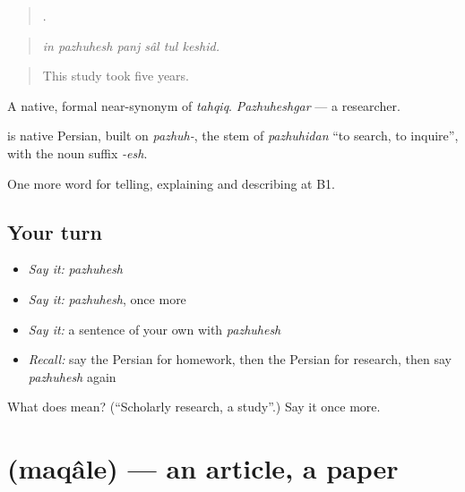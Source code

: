 \begin{quote}
     .
\end{quote}

\begin{quote}
\emph{in pazhuhesh panj sâl tul keshid.}
\end{quote}

\begin{quote}
This study took five years.
\end{quote}

A native, formal near-synonym of \emph{tahqiq}. \emph{Pazhuheshgar} — a researcher.

\begin{cousinweb}
\textbf{} is native Persian, built on \emph{pazhuh-}, the stem of \emph{pazhuhidan} \textquotedblleft{}to search, to inquire\textquotedblright{}, with the noun suffix \emph{-esh}.
\end{cousinweb}

\begin{grammarlens}[title={What you've built}]
One more word for telling, explaining and describing at B1.
\end{grammarlens}

\subsection*{Your turn}
\begin{itemize}
\raggedright
  \item \emph{Say it:} \emph{pazhuhesh}
  \item \emph{Say it:} \emph{pazhuhesh}, once more
  \item \emph{Say it:} a sentence of your own with \emph{pazhuhesh}
  \item \emph{Recall:} say the Persian for homework, then the Persian for research, then say \emph{pazhuhesh} again
\end{itemize}

\begin{tcolorbox}[breakable,colback=teal!4,colframe=teal!35!black,title={Before you move on}]
What does  mean? (\textquotedblleft{}Scholarly research, a study\textquotedblright{}.) Say it once more.
\end{tcolorbox}
\section[\texorpdfstring{\fa{مقاله} (maqâle)}{مقاله (maqâle)}]{ (maqâle) — an article, a paper}

